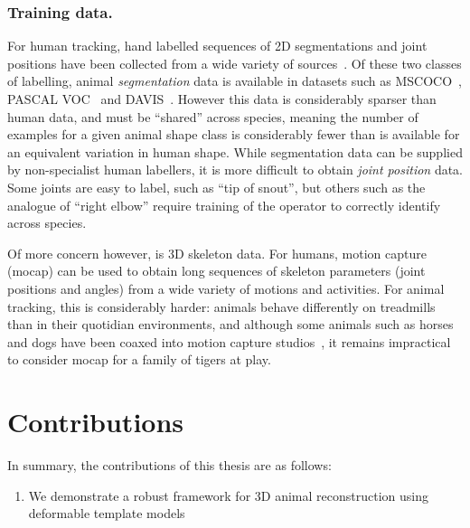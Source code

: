     \subsubsection*{Training data.}
    For human tracking, hand labelled sequences of 2D segmentations and joint positions have been collected from a wide variety of sources~\cite{andriluka14cvpr,lin2014microsoft,johnson2010clustered}. Of these two classes of labelling, animal {\em segmentation} data is available in datasets such as MSCOCO~\cite{lin2014microsoft}, PASCAL VOC~\cite{everingham2010pascal} and DAVIS~\cite{Perazzi2016}.  However this data is considerably sparser than human data, and must be ``shared'' across species, meaning the number of examples for a given animal shape class is considerably fewer than is available for an equivalent variation in human shape.  While segmentation data can be supplied by non-specialist human labellers, it is more difficult to obtain {\em joint position} data.  Some joints are easy to label, such as ``tip of snout'', but others such as the analogue of ``right elbow'' require training of the operator to correctly identify across species.

    Of more concern however, is 3D skeleton data.  For humans, motion capture (mocap) can be used to obtain long sequences of skeleton parameters (joint positions and angles) from a wide variety of motions and activities.
    For animal tracking, this is considerably harder: animals behave differently on treadmills than in their quotidian environments, and although some animals such as horses and dogs have been coaxed into motion capture studios~\cite{wilhelm2015furyexplorer}, it remains impractical to consider mocap for a family of tigers at play.



\section{Contributions}  %
In summary, the contributions of this thesis are as follows:
\begin{enumerate}
    \item We demonstrate a robust framework for 3D animal reconstruction using deformable template models
\end{enumerate}

